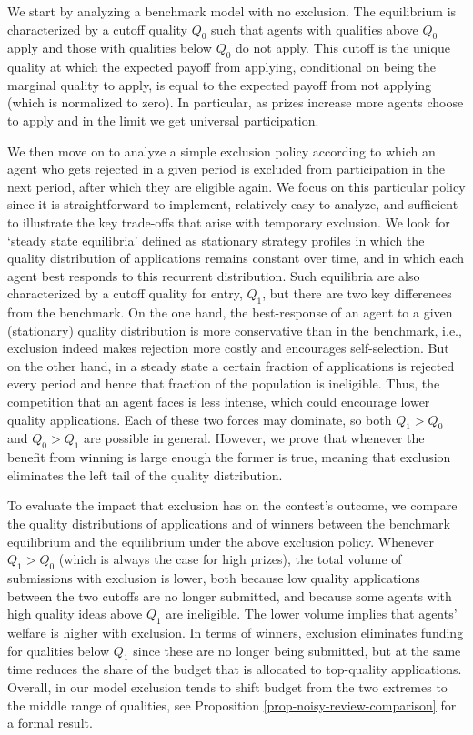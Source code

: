 \documentclass[12pt]{article}
\theoremstyle{plain}
\theoremstyle{definition}
\theoremstyle{remark}
\begin{document}
We start by analyzing a benchmark model with no exclusion. The equilibrium is characterized by a cutoff quality $Q_0$ such that agents with qualities above $Q_0$ apply and those with qualities below $Q_0$ do not apply. This cutoff is the unique quality at which the expected payoff from applying, conditional on being the marginal quality to apply, is equal to the expected payoff from not applying (which is normalized to zero). In particular, as prizes increase more agents choose to apply and in the limit we get universal participation. 

We then move on to analyze a simple exclusion policy according to which an agent who gets rejected in a given period is excluded from participation in the next period, after which they are eligible again. We focus on this particular policy since it is straightforward to implement, relatively easy to analyze, and sufficient to illustrate the key trade-offs that arise with temporary exclusion. We look for `steady state equilibria' defined as stationary strategy profiles in which the quality distribution of applications remains constant over time, and in which each agent best responds to this recurrent distribution. Such equilibria are also characterized by a cutoff quality for entry, $Q_1$, but there are two key differences from the benchmark. On the one hand, the best-response of an agent to a given (stationary) quality distribution is more conservative than in the benchmark, i.e., exclusion indeed makes rejection more costly and encourages self-selection. But on the other hand, in a steady state a certain fraction of applications is rejected every period and hence that fraction of the population is ineligible. Thus, the competition that an agent faces is less intense, which could encourage lower quality applications. Each of these two forces may dominate, so both $Q_1>Q_0$ and $Q_0>Q_1$ are possible in general. However, we prove that whenever the benefit from winning is large enough the former is true, meaning that exclusion eliminates the left tail of the quality distribution. 

To evaluate the impact that exclusion has on the contest's outcome, we compare the quality distributions of applications and of winners between the benchmark equilibrium and the equilibrium under the above exclusion policy. Whenever $Q_1>Q_0$ (which is always the case for high prizes), the total volume of submissions with exclusion is lower, both because low quality applications between the two cutoffs are no longer submitted, and because some agents with high quality ideas above $Q_1$ are ineligible. The lower volume implies that agents' welfare is higher with exclusion. In terms of winners, exclusion eliminates funding for qualities below $Q_1$ since these are no longer being submitted, but at the same time reduces the share of the budget that is allocated to top-quality applications. Overall, in our model exclusion tends to shift budget from the two extremes to the middle range of qualities, see Proposition \ref{prop-noisy-review-comparison} for a formal result. 
\end{document}
